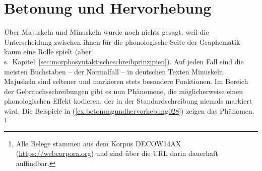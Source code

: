 
\section{Betonung und Hervorhebung}
\label{sec:betonungundhervorhebung}


Über Majuskeln und Minuskeln wurde noch nichts gesagt, weil die Unterscheidung zwischen ihnen für die phonologische Seite der Graphematik kaum eine Rolle spielt (aber s.\ Kapitel~\ref{sec:morphosyntaktischeschreibprinzipien}).
Auf jeden Fall sind die meisten Buchstaben -- der Normalfall -- in deutschen Texten Minuskeln.
Majuskeln sind seltener und markieren stets besondere Funktionen.
Im Bereich der Gebrauchsschreibungen gibt es nun Phänomene, die möglicherweise einen phonologischen Effekt kodieren, der in der Standardschreibung niemals markiert wird.
Die Beispiele in (\ref{ex:betonungundhervorhebung028}) zeigen das Phänomen.%
\footnote{Alle Belege stammen aus dem Korpus DECOW14AX (\url{https://webcorpora.org}) und sind über die URL darin dauerhaft auffindbar.}

\begin{exe}
  \ex\label{ex:betonungundhervorhebung028}
  \begin{xlist}
  \end{xlist}
\end{exe}

